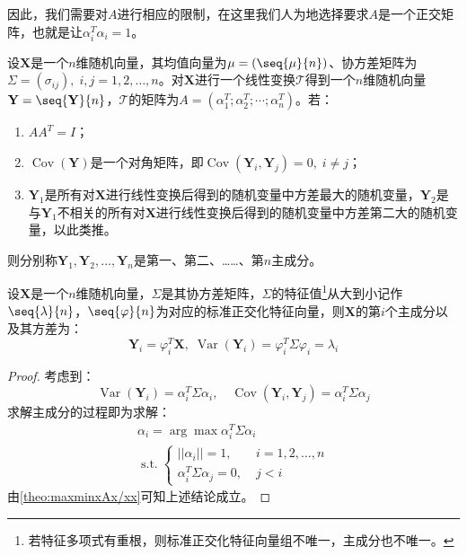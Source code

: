 因此，我们需要对$A$进行相应的限制，在这里我们人为地选择要求$A$是一个正交矩阵，也就是让$\alpha_i^T\alpha_i=1$。
\begin{definition}
	设$\mathbf{X}$是一个$n$维随机向量，其均值向量为$\mu=(\seq{\mu}{n})$、协方差矩阵为$\Sigma=(\sigma_{ij}),\;i,j=1,2,\dots,n$。对$\mathbf{X}$进行一个线性变换$\mathcal{T}$得到一个$n$维随机向量$\mathbf{Y}=\seq{\mathbf{Y}}{n}$，$\mathcal{T}$的矩阵为$A=(\alpha_1^T;\alpha_2^T;\cdots;\alpha_n^T)$。若：
	\begin{enumerate}
		\item $AA^T=I$；
		\item $\operatorname{Cov}(\mathbf{Y})$是一个对角矩阵，即$\operatorname{Cov}(\mathbf{Y}_i,\mathbf{Y}_j)=0,\;i\ne j$；
		\item $\mathbf{Y}_1$是所有对$\mathbf{X}$进行线性变换后得到的随机变量中方差最大的随机变量，$\mathbf{Y}_2$是与$\mathbf{Y}_1$不相关的所有对$\mathbf{X}$进行线性变换后得到的随机变量中方差第二大的随机变量，以此类推。
	\end{enumerate}
	则分别称$\mathbf{Y}_1,\mathbf{Y}_2,\dots,\mathbf{Y}_n$是第一、第二、……、第$n$主成分。
\end{definition}
\begin{theorem}\label{theo:PCA}
	设$\mathbf{X}$是一个$n$维随机向量，$\Sigma$是其协方差矩阵，$\Sigma$的特征值\footnote{若特征多项式有重根，则标准正交化特征向量组不唯一，主成分也不唯一。}从大到小记作$\seq{\lambda}{n}$，$\seq{\varphi}{n}$为对应的标准正交化特征向量，则$\mathbf{X}$的第$i$个主成分以及其方差为：
	\begin{equation*}
		\mathbf{Y}_i=\varphi_i^T\mathbf{X},\;\operatorname{Var}(\mathbf{Y}_i)=\varphi_i^T\Sigma\varphi_i=\lambda_i
	\end{equation*}
\end{theorem}
\begin{proof}
	考虑到：
	\begin{equation*}
		\operatorname{Var}(\mathbf{Y}_i)=\alpha_i^T\Sigma\alpha_i,\quad
		\operatorname{Cov}(\mathbf{Y}_i,\mathbf{Y}_j)=\alpha_i^T\Sigma\alpha_j
	\end{equation*}
	求解主成分的过程即为求解：
	\begin{gather*}
		\alpha_i=\arg\max\alpha_i^T\Sigma\alpha_i \\
		\operatorname{s.t.}
		\begin{cases}
			||\alpha_i||=1,\;&i=1,2,\dots,n\\
			\alpha_i^T\Sigma\alpha_j=0,\;&j<i
		\end{cases}
	\end{gather*}
	由\cref{theo:maxminxAx/xx}可知上述结论成立。
\end{proof}
